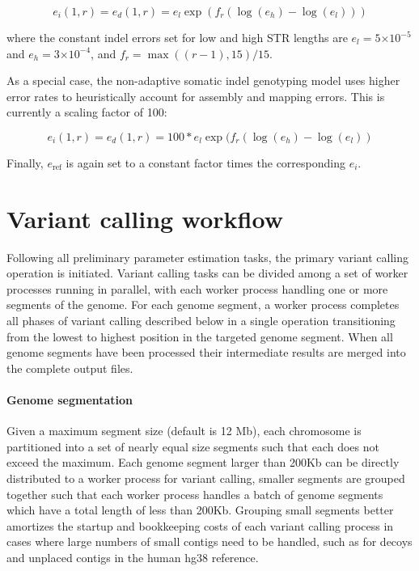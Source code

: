 \documentclass{article}
\newcommand{\e}[1]{\ensuremath{\times 10^{#1}}}
\begin{document}
\begin{equation*}
e_i(1,r) = e_d(1,r) = e_{l} \exp(f_r(\log(e_{h})-\log(e_{l})))
\end{equation*}

\noindent where the constant indel errors set for low and high STR lengths are $e_{l} = 5\e{-5}$ and $e_{h} = 3\e{-4}$, and $f_r = \max((r-1),15)/15$.

As a special case, the non-adaptive somatic indel genotyping model uses higher error rates to heuristically account for assembly and mapping errors. This is currently a scaling factor of 100: 

\begin{equation*}
e_i(1,r) = e_d(1,r) = 100 * e_{l} \exp(f_r(\log(e_{h})-\log(e_{l}))
\end{equation*}

Finally, $e_{\text{ref}}$ is again set to a constant factor  times the corresponding $e_i$.


\section{Variant calling workflow}

Following all preliminary parameter estimation tasks, the primary variant calling operation is initiated. Variant calling tasks can be divided among a set of worker processes running in parallel, with each worker process handling one or more segments of the genome. For each genome segment, a worker process completes all phases of variant calling described below in a single operation transitioning from the lowest to highest position in the targeted genome segment. When all genome segments have been processed their intermediate results are merged into the complete output files.

\paragraph{Genome segmentation} Given a maximum segment size (default is 12 Mb), each chromosome is partitioned into a set of nearly equal size segments such that each does not exceed the maximum. Each genome segment larger than 200Kb can be directly distributed to a worker process for variant calling, smaller segments are grouped together such that each worker process handles a batch of genome segments which have a total length of less than 200Kb. Grouping small segments better amortizes the startup and bookkeeping costs of each variant calling process in cases where large numbers of small contigs need to be handled, such as for decoys and unplaced contigs in the human hg38 reference.
\end{document}
